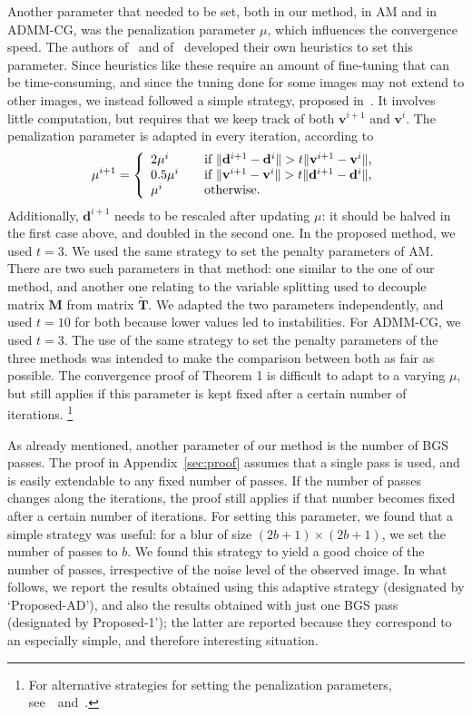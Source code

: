 \documentclass[10pt,twocolumn,twoside]{IEEEtran}
\newcommand{\vs}{\mathbf{v}} %
\newcommand{\dv}{\mathbf{d}} %
\newcommand{\M}{\mathbf{M}} %
\newcommand{\T}{\mathbf{T}} %
\begin{document}
Another parameter that needed to be set, both in our method, in AM and in ADMM-CG, was the penalization parameter $\mu$, which influences the convergence speed. The authors of~\cite{Almeida2013a} and of~\cite{Matakos2013} developed their own heuristics to set this parameter. Since heuristics like these require an amount of fine-tuning that can be time-consuming, and since the tuning done for some images may not extend to other images, we instead followed a simple strategy, proposed in~\cite{Boyd2011}. It involves little computation, but requires that we keep track of both $\vs^{i+1}$ and $\vs^i$. The penalization parameter is adapted in every iteration, according to
\begin{equation} \label{eq:varying_penalty}
	\mu^{i+1} = \left\{
	\begin{array}{l l}
		2\mu^i & \quad \text{if $\| \dv^{i+1} - \dv^i \| > t \| \vs^{i+1} - \vs^i \|$,}\\
		0.5\mu^i & \quad \text{if $\| \vs^{i+1} - \vs^i \| > t \| \dv^{i+1} - \dv^i \|$,}\\
		\mu^i & \quad \text{otherwise.}
	\end{array} \right.
\end{equation}
Additionally, $\dv^{i+1}$ needs to be rescaled after updating $\mu$: it should be halved in the first case above, and doubled in the second one. In the proposed method, we used $t=3$. We used the same strategy to set the penalty parameters of AM. There are two such parameters in that method: one similar to the one of our method, and another one relating to the variable splitting used to decouple matrix $\M$ from matrix $\tilde{\T}$. We adapted the two parameters independently, and used $t=10$ for both because lower values led to instabilities. For ADMM-CG, we used $t=3$. The use of the same strategy to set the penalty parameters of the three methods was intended to make the comparison between both as fair as possible. The convergence proof of Theorem 1 is difficult to adapt to a varying $\mu$, but still applies if this parameter is kept fixed after a certain number of iterations. \footnote{For alternative strategies for setting the penalization parameters, see~\mbox{\cite{Boyd2011} and \cite{He2000}}.}

As already mentioned, another parameter of our method is the number of BGS passes. The proof in Appendix~\ref{sec:proof} assumes that a single pass is used, and is easily extendable to any fixed number of passes. If the number of passes changes along the iterations, the proof still applies if that number becomes fixed after a certain number of iterations. For setting this parameter, we found that a simple strategy was useful: for a blur of size $(2b+1)\times(2b+1)$, we set the number of passes to $b$. We found this strategy to yield a good choice of the number of passes, irrespective of the noise level of the observed image. In what follows, we report the results obtained using this adaptive strategy (designated by `Proposed-AD'), and also the results obtained with just one BGS pass (designated by Proposed-1'); the latter are reported because they correspond to an especially simple, and therefore interesting situation.
\end{document}
